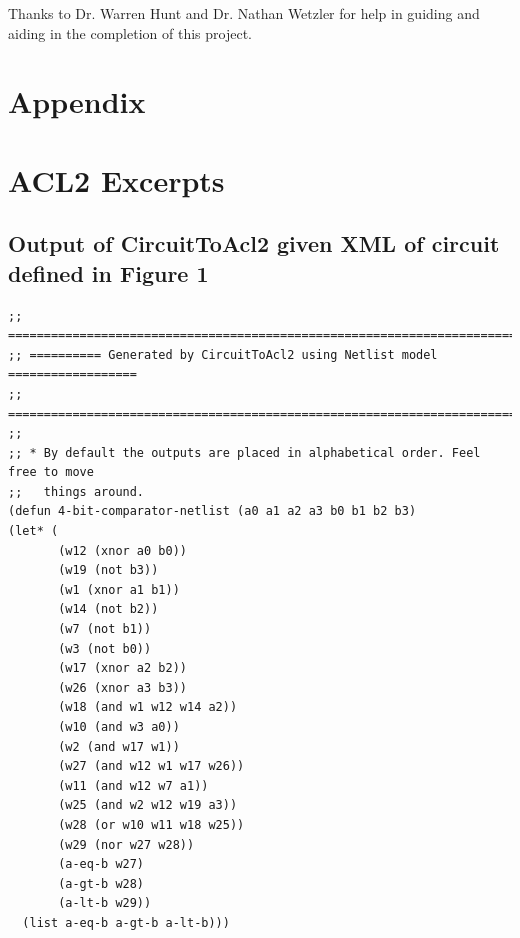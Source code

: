 \documentclass[fleqn,10pt]{SelfArx} %
\begin{document}

Thanks to Dr. Warren Hunt and Dr. Nathan Wetzler for help in guiding and aiding in the completion of this project.





\onecolumn
\appendix
\section*{Appendix}
\section{ACL2 Excerpts}
\subsection*{Output of CircuitToAcl2 given XML of circuit defined in Figure 1}
\begin{lstlisting}
;; ============================================================================ 
;; ========== Generated by CircuitToAcl2 using Netlist model ================== 
;; ============================================================================ 
;; 
;; * By default the outputs are placed in alphabetical order. Feel free to move 
;;   things around.
(defun 4-bit-comparator-netlist (a0 a1 a2 a3 b0 b1 b2 b3)   
(let* (          
       (w12 (xnor a0 b0))          
       (w19 (not b3))          
       (w1 (xnor a1 b1))          
       (w14 (not b2))          
       (w7 (not b1))          
       (w3 (not b0))          
       (w17 (xnor a2 b2))          
       (w26 (xnor a3 b3))          
       (w18 (and w1 w12 w14 a2))          
       (w10 (and w3 a0))          
       (w2 (and w17 w1))          
       (w27 (and w12 w1 w17 w26))          
       (w11 (and w12 w7 a1))          
       (w25 (and w2 w12 w19 a3))          
       (w28 (or w10 w11 w18 w25))          
       (w29 (nor w27 w28))          
       (a-eq-b w27)          
       (a-gt-b w28)          
       (a-lt-b w29))     
  (list a-eq-b a-gt-b a-lt-b)))
\end{lstlisting}
\end{document}
